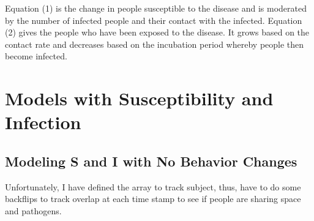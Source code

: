 \documentclass{article}\usepackage[]{graphicx}\usepackage[]{color}
\begin{document}
Equation (1) is the change in people susceptible to the disease and is moderated by the number of infected people and their contact with the infected. Equation (2) gives the people who have been exposed to the disease. It grows based on the contact rate and decreases based on the incubation period whereby people then become infected.


\section{Models with Susceptibility and Infection}

\subsection{Modeling S and I with No Behavior Changes}

Unfortunately, I have defined the array to track subject, thus, have to do some backflips to track overlap at each time stamp to see if people are sharing space and pathogens.
\end{document}
